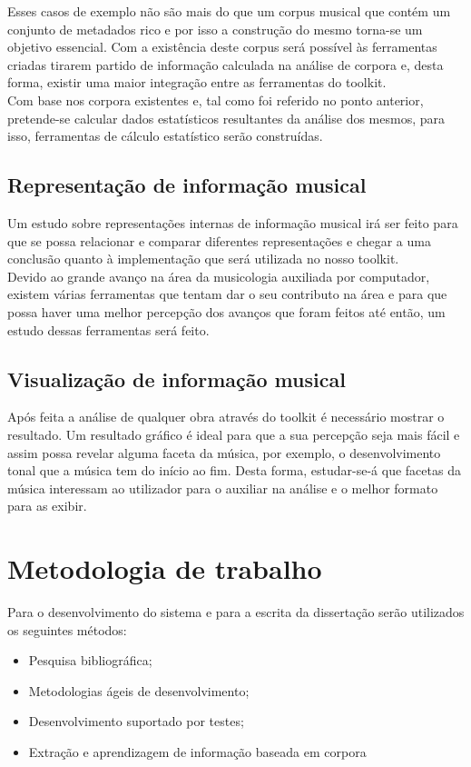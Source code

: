 \documentclass[runningheads,a4paper]{llncs}
\begin{document}
Esses casos de exemplo não são mais do que um corpus musical que contém um conjunto de metadados
rico e por isso a construção do mesmo torna-se um objetivo essencial. Com a existência deste corpus
será possível às ferramentas criadas tirarem partido de informação calculada na análise de corpora
e, desta forma, existir uma maior integração entre as ferramentas do toolkit.\\

Com base nos corpora existentes e, tal como foi referido no ponto anterior, pretende-se calcular
dados estatísticos resultantes da análise dos mesmos, para isso, ferramentas de cálculo estatístico
serão construídas.\\

\subsection*{Representação de informação musical}
Um estudo sobre representações internas de informação musical irá ser feito para que se possa
relacionar e comparar diferentes representações e chegar a uma conclusão quanto à implementação que
será utilizada no nosso toolkit.\\

Devido ao grande avanço na área da musicologia auxiliada por computador, existem várias ferramentas
que tentam dar o seu contributo na área e para que possa haver uma melhor percepção dos avanços que
foram feitos até então, um estudo dessas ferramentas será feito.\\

\subsection*{Visualização de informação musical}
Após feita a análise de qualquer obra através do toolkit é necessário mostrar o resultado. Um
resultado gráfico é ideal para que a sua percepção seja mais fácil e assim possa revelar alguma
faceta da música, por exemplo, o desenvolvimento tonal que a música tem do início ao fim. Desta
forma, estudar-se-á que facetas da música interessam ao utilizador para o auxiliar na análise e o
melhor formato para as exibir.

\section{Metodologia de trabalho}
Para o desenvolvimento do sistema e para a escrita da dissertação serão utilizados os seguintes
métodos:
\begin{itemize}
\item Pesquisa bibliográfica;
\item Metodologias ágeis de desenvolvimento;
\item Desenvolvimento suportado por testes;
\item Extração e aprendizagem de informação baseada em corpora
\end{itemize}
\end{document}

